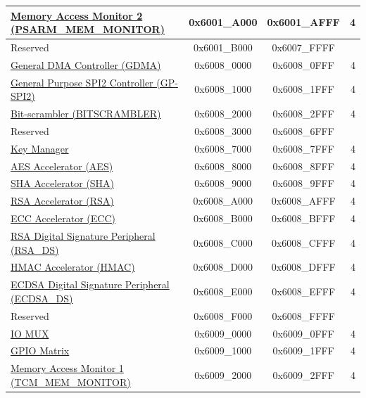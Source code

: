 \begin{ThreePartTable}
\begin{longtable}[c]{ |p{7cm}|c|c|r| }
    \hyperref[mod:dbgassist]{Memory Access Monitor 2 (PSARM\_MEM\_MONITOR)} \tnote{\textcolor{red}{2}}                & 0x6001\_A000 & 0x6001\_AFFF &   4   \\\hline    
        \rowcolor{gray!25}  Reserved                    & 0x6001\_B000 & 0x6007\_FFFF &        \\\hline
    \hyperref[mod:dma]{General DMA Controller (GDMA)}& 0x6008\_0000 & 0x6008\_0FFF &   4     \\\hline
    \hyperref[mod:spi]{General Purpose SPI2 Controller (GP-SPI2)} & 0x6008\_1000 & 0x6008\_1FFF &   4     \\\hline
    \hyperref[mod:bitscrm]{Bit-scrambler (BITSCRAMBLER)}& 0x6008\_2000 & 0x6008\_2FFF &   4     \\\hline
        \rowcolor{gray!25}  Reserved                    & 0x6008\_3000 & 0x6008\_6FFF &         \\\hline
    \hyperref[mod:keymng]{Key Manager} & 0x6008\_7000 & 0x6008\_7FFF &   4     \\\hline
    \hyperref[mod:aes]{AES Accelerator (AES)} & 0x6008\_8000 & 0x6008\_8FFF &   4     \\\hline
    \hyperref[mod:sha]{SHA Accelerator (SHA)} & 0x6008\_9000 & 0x6008\_9FFF &   4     \\\hline
    \hyperref[mod:rsa]{RSA Accelerator (RSA)}& 0x6008\_A000 & 0x6008\_AFFF &   4     \\\hline
    \hyperref[mod:ecc]{ECC Accelerator (ECC)}& 0x6008\_B000 & 0x6008\_BFFF &   4     \\\hline
    \hyperref[mod:digsig]{RSA Digital Signature Peripheral (RSA\_DS)}  & 0x6008\_C000 & 0x6008\_CFFF &   4     \\\hline
    \hyperref[mod:hmac]{HMAC Accelerator (HMAC)}& 0x6008\_D000 & 0x6008\_DFFF &   4     \\\hline
    \hyperref[mod:ecdsa]{ECDSA Digital Signature Peripheral (ECDSA\_DS)}& 0x6008\_E000 & 0x6008\_EFFF &   4     \\\hline
        \rowcolor{gray!25}  Reserved                    & 0x6008\_F000 & 0x6008\_FFFF &         \\\hline
    \hyperref[mod:iomuxgpio]{IO MUX}                      & 0x6009\_0000 & 0x6009\_0FFF &   4     \\\hline
    \hyperref[mod:iomuxgpio]{GPIO Matrix}& 0x6009\_1000 & 0x6009\_1FFF &   4     \\\hline
    \hyperref[mod:dbgassist]{Memory Access Monitor 1 (TCM\_MEM\_MONITOR)} \tnote{\textcolor{red}{2}}                & 0x6009\_2000 & 0x6009\_2FFF &   4   \\\hline

\end{longtable}
\end{ThreePartTable}
